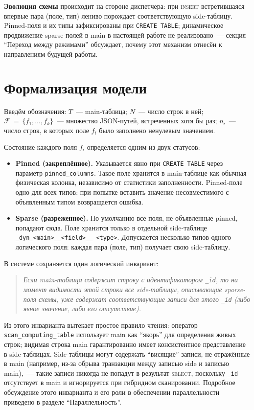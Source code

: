 \textbf{Эволюция схемы} происходит на стороне диспетчера: при
\textsc{insert} встретившаяся впервые пара (поле, тип) лениво
порождает соответствующую side-таблицу. Pinned-поля и их типы
зафиксированы при \texttt{CREATE TABLE}; динамическое продвижение
sparse-полей в main в настоящей работе не реализовано~--- секция
``Переход между режимами'' обсуждает, почему этот механизм отнесён
к направлениям будущей работы.

\section{Формализация модели}

Введём обозначения: $T$~--- main-таблица; $N$~--- число строк в
ней; $\mathcal{F}~=~\{f_1, \ldots, f_k\}$~--- множество
JSON-путей, встреченных хотя бы раз; $n_i$~--- число строк, в
которых поле $f_i$ было заполнено ненулевым значением.

Состояние каждого поля $f_i$ определяется одним из двух статусов:
\begin{itemize}
    \item \textbf{Pinned (закреплённое).} Указывается явно при
    \texttt{CREATE TABLE} через параметр \texttt{pinned\_columns}.
    Такое поле хранится в main-таблице как обычная физическая
    колонка, независимо от статистики заполненности. Pinned-поле
    одно для всех типов: при попытке вставить значение
    несовместимого с объявленным типом возвращается ошибка.
    \item \textbf{Sparse (разреженное).} По умолчанию все поля,
    не объявленные pinned, попадают сюда. Поле хранится только в
    отдельной side-таблице \texttt{\_dyn\_<main>\_\_<field>\_\_
    <type>}. Допускается несколько типов одного логического поля:
    каждая пара (поле, тип) получает свою side-таблицу.
\end{itemize}

В системе сохраняется один логический инвариант:
\begin{quote}\itshape
Если main-таблица содержит строку с идентификатором \texttt{\_id},
то на момент видимости этой строки все side-таблицы, описывающие
sparse-поля схемы, уже содержат соответствующие записи для этого
\texttt{\_id} (либо явное значение, либо его отсутствие).
\end{quote}
Из этого инварианта вытекает простое правило чтения: оператор
\texttt{scan\_computing\_table} использует main как ``якорь'' для
определения живых строк; видимая строка main гарантированно имеет
консистентное представление в side-таблицах. Side-таблицы могут
содержать ``висящие'' записи, не отражённые в main (например, из-за
обрыва транзакции между записью side и записью main),~--- такие
записи никогда не попадут в результат \textsc{select}, поскольку
\texttt{\_id} отсутствует в main и игнорируется при гибридном
сканировании. Подробное обсуждение этого инварианта и его роли
в обеспечении параллельности приведено в разделе
``Параллельность''.

